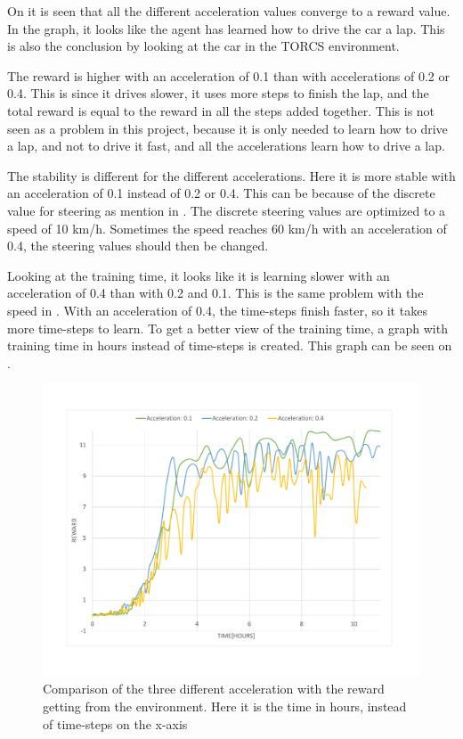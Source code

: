 On  it is seen that all the different acceleration values converge to a reward value. In the graph, it looks like the agent has learned how to drive the car a lap. This is also the conclusion by looking at the car in the TORCS environment. 

The reward is higher with an acceleration of 0.1 than with accelerations of 0.2 or 0.4. This is since it drives slower, it uses more steps to finish the lap, and the total reward is equal to the reward in all the steps added together. This is not seen as a problem in this project, because it is only needed to learn how to drive a lap, and not to drive it fast, and all the accelerations learn how to drive a lap.

The stability is different for the different accelerations. Here it is more stable with an acceleration of 0.1 instead of 0.2 or 0.4. This can be because of the discrete value for steering as mention in . The discrete steering values are optimized to a speed of 10 km/h. Sometimes the speed reaches 60 km/h with an acceleration of 0.4, the steering values should then be changed.  

Looking at the training time, it looks like it is learning slower with an acceleration of 0.4 than with 0.2 and 0.1. This is the same problem with the speed in . With an acceleration of 0.4, the time-steps finish faster, so it takes more time-steps to learn. To get a better view of the training time, a graph with training time in hours instead of time-steps is created. This graph can be seen on .       

\begin{figure}[H]
	\centering
	\includegraphics[width=1\textwidth]{Figures/Result/change_of_acceleration_new_reward_hours_graph.pdf}
	\caption{Comparison of the three different acceleration with the reward getting from the environment. Here it is the time in hours, instead of time-steps on the x-axis}
	\label{fig:change_of_acceleration_new_reward_hours_graph}
\end{figure}

